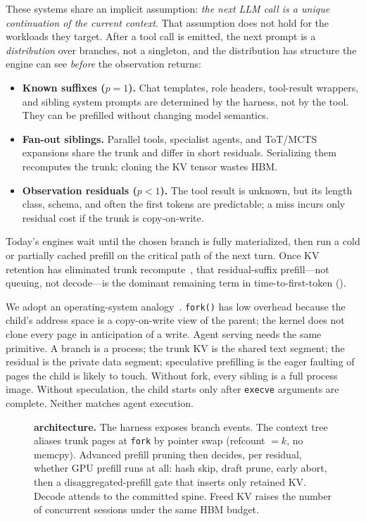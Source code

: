 These systems share an implicit assumption: \emph{the next LLM call is a unique continuation of the current context}.
That assumption does not hold for the workloads they target.
After a tool call is emitted, the next prompt is a \emph{distribution} over branches, not a singleton, and the distribution has structure the engine can see \emph{before} the observation returns:
\begin{itemize}
\item \textbf{Known suffixes ($p{=}1$).} Chat templates, role headers, tool-result wrappers, and sibling system prompts are determined by the harness, not by the tool. They can be prefilled without changing model semantics.
\item \textbf{Fan-out siblings.} Parallel tools, specialist agents, and ToT/MCTS expansions share the trunk and differ in short residuals. Serializing them recomputes the trunk; cloning the KV tensor wastes HBM.
\item \textbf{Observation residuals ($p{<}1$).} The tool result is unknown, but its length class, schema, and often the first tokens are predictable; a miss incurs only residual cost if the trunk is copy-on-write.
\end{itemize}
Today's engines wait until the chosen branch is fully materialized, then run a cold or partially cached prefill on the critical path of the next turn.
Once KV retention has eliminated trunk recompute~\cite{continuum,mori}, that residual-suffix prefill---not queuing, not decode---is the dominant remaining term in time-to-first-token (\ttft).

We adopt an operating-system analogy~\cite{osfork,tanenbaumos}.
\texttt{fork()} has low overhead because the child's address space is a copy-on-write view of the parent; the kernel does not clone every page in anticipation of a write.
Agent serving needs the same primitive.
A branch is a process; the trunk KV is the shared text segment; the residual is the private data segment; speculative prefilling is the eager faulting of pages the child is likely to touch.
Without fork, every sibling is a full process image. Without speculation, the child starts only after \texttt{execve} arguments are complete. Neither matches agent execution.

\begin{figure}[t]
\centering
\resizebox{\textwidth}{!}{}
\caption{\textbf{\sys{} architecture.}
The harness exposes branch events.
The context tree aliases trunk pages at \texttt{fork} by pointer swap (refcount $=k$, no memcpy).
Advanced prefill pruning then decides, per residual, whether GPU prefill runs at all: hash skip, draft prune, early abort, then a disaggregated-prefill gate that inserts only retained KV.
Decode attends to the committed spine.
Freed KV raises the number of concurrent sessions under the same HBM budget.
}
\label{fig:system}
\end{figure}

